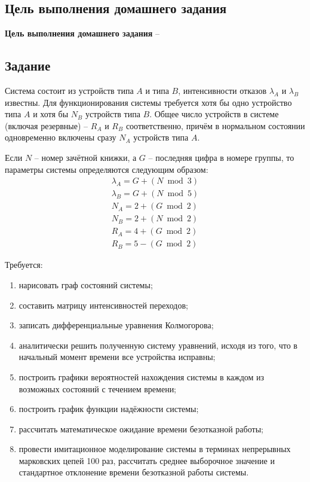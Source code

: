 \subsection{Цель выполнения домашнего задания}\label{blockN.VariantM}
\textbf{Цель выполнения домашнего задания }-- \GoalOfResearch

\subsection{Задание}
Система состоит из устройств типа $A$ и типа $B$, интенсивности отказов $\lambda_A$ и $\lambda_B$ известны.
Для функционирования системы требуется хотя бы одно устройство типа $A$ и хотя бы $N_B$ устройств типа $B$.
Общее число устройств в системе (включая резервные) – $R_A$ и $R_B$ соответственно,
причём в нормальном состоянии одновременно включены сразу $N_A$ устройств типа $A$.

Если $N$ – номер зачётной книжки, а $G$ – последняя цифра в номере группы,
то параметры системы определяются следующим образом:
\[
\begin{matrix}
    \lambda_A= G + (N \bmod 3) \\
    \lambda_B= G + (N \bmod 5) \\
    N_A= 2 + (G \bmod 2) \\
    N_B= 2 + (N \bmod 2) \\
    R_A= 4 + (G \bmod 2) \\
    R_B= 5 - (G \bmod 2)
\end{matrix}
\]

Требуется:
\begin{enumerate}
    \item нарисовать граф состояний системы;
    \item составить матрицу интенсивностей переходов;
    \item записать дифференциальные уравнения Колмогорова;
    \item аналитически решить полученную систему уравнений, исходя из того, что в начальный момент времени все устройства исправны;
    \item построить графики вероятностей нахождения системы в каждом из возможных состояний с течением времени;
    \item построить график функции надёжности системы;
    \item рассчитать математическое ожидание времени безотказной работы;
    \item провести имитационное моделирование системы в терминах непрерывных марковских цепей 100 раз, рассчитать среднее выборочное значение и стандартное отклонение времени безотказной работы системы.
\end{enumerate}
\newpage
